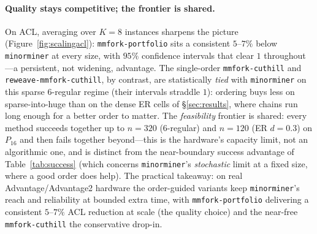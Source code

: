 \documentclass[acmsmall,anonymous,nonacm]{acmart}
\begin{document}
\paragraph{Quality stays competitive; the frontier is shared.} On ACL, averaging
over $K{=}8$ instances sharpens the picture (Figure~\ref{fig:scalingacl}):
\texttt{mmfork-portfolio} sits a consistent $5$--$7\%$ below \texttt{minorminer} at
every size, with $95\%$ confidence intervals that clear $1$ throughout---a persistent,
not widening, advantage. The single-order \texttt{mmfork-cuthill} and
\texttt{reweave-mmfork-cuthill}, by contrast, are statistically \emph{tied} with
\texttt{minorminer} on this sparse $6$-regular regime (their intervals straddle $1$):
ordering buys less on sparse-into-huge than on the dense ER cells of
\S\ref{sec:results}, where chains run long enough for a better order to matter. The
\emph{feasibility} frontier is shared: every method succeeds together up to
$n{=}320$ ($6$-regular) and $n{=}120$ (ER $d{=}0.3$) on $P_{16}$ and then fails
together beyond---this is the hardware's capacity limit, not an algorithmic one, and
is distinct from the near-boundary success advantage of Table~\ref{tab:success}
(which concerns \texttt{minorminer}'s \emph{stochastic} limit at a fixed size, where
a good order does help). The practical takeaway: on real Advantage/Advantage2
hardware the order-guided variants keep \texttt{minorminer}'s reach and reliability at
bounded extra time, with \texttt{mmfork-portfolio} delivering a consistent $5$--$7\%$
ACL reduction at scale (the quality choice) and the near-free \texttt{mmfork-cuthill}
the conservative drop-in.
\end{document}
